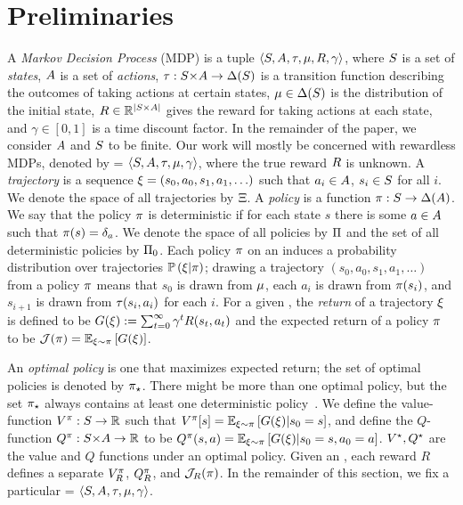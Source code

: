 \section{Preliminaries}\label{sec:preliminaries}


A \emph{Markov Decision Process} (MDP) is a tuple $\FullMDP$, where $\S$ is a set of \emph{states}, $\A$ is a set of \emph{actions}, $\T: \SxA \to \dist{S}$ is a transition function describing the outcomes of taking actions at certain states, $\m \in \dist{S}$ is the distribution of the initial state, $\R \in \RR^{|\SxA|}$ gives the reward for taking actions at each state, and $\gamma \in [0, 1]$ is a time discount factor.
In the remainder of the paper, we consider $\A$ and $\S$ to be finite. Our work will mostly be concerned with rewardless MDPs, denoted by \MDPR = $\FullMDPR$, where the true reward $\R$ is unknown.
A \emph{trajectory} is a sequence $\trajectory = (s_0, a_0, s_1, a_1, \ldots)$ such that $a_i \in \A$, $s_i \in \S$ for all $i$.
We denote the space of all trajectories by $\Trajectories$.
A \emph{policy} is a function $\policy :\S \to \dist{A}$. We say that the policy $\policy$ is deterministic if for each state $s$ there is some $a \in \A$ such that $\policy(s) = \delta_{a}$. We denote the space of all policies by $\Policies$ and the set of all deterministic policies by $\DetPolicies$.
Each policy $\policy$ on an \MDPR induces a probability distribution over trajectories $\Prob{\trajectory | \policy}$; drawing a trajectory $(s_0, a_0, s_1, a_1, \ldots)$ from a policy $\policy$ means that $s_0$ is drawn from $\m$, each $a_i$ is drawn from $\policy(s_i)$, and $s_{i+1}$ is drawn from $\T(s_i, a_i)$ for each $i$. 
For a given \MDP, the \emph{return} of a trajectory $\trajectory$ is defined to be $\Returns(\trajectory) := \sum_{t=0}^\infty \discount^t \R(s_t, a_t)$ and the expected return of a policy $\policy$ to be $\J(\policy) = \Expect{\trajectory \sim \policy}{G(\trajectory)}$.

An \emph{optimal policy} is one that maximizes expected return; the set of optimal policies is denoted by $\OptimalPolicy$. There might be more than one optimal policy, but the set $\OptimalPolicy$ always contains at least one deterministic policy~\citep{sutton2018}. We define the value-function $\Vfor{\policy}:\S \to \RR$ such that $\Vfor{\policy}[s] = \Expect{\trajectory \sim \policy}{G(\trajectory)|s_0 = s}$, and define the $Q$-function $\Qfor{\policy}:\SxA \to \RR$ to be $\Qfor{\policy}(s, a) = \Expect{\trajectory \sim \policy}{G(\trajectory)|s_0 = s, a_0=a}$. $\VStar, \QStar$ are the value and $Q$ functions under an optimal policy. Given an \MDPR, each reward $R$ defines a separate $\Vfor{\pi}_\R$, $\Qfor{\pi}_\R$, and $\J_\R(\pi)$. In the remainder of this section, we fix a particular {\MDPR = $\FullMDPR$}.

